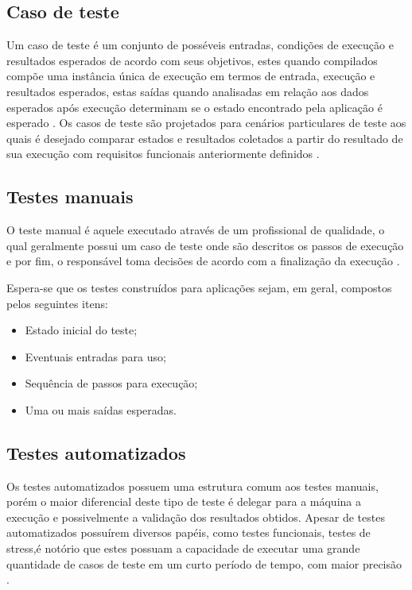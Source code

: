 \documentclass[
	12pt,				%
	oneside,			%
	a4paper,			%
	english,			%
	brazil				%
	]{abntex2ppgsi}
\begin{document}
\subsection{Caso de teste}
Um caso de teste  é um conjunto de posséveis entradas, condições de execução e resultados esperados de acordo com seus objetivos, estes quando compilados compõe uma instância única de execução em termos de entrada, execução e resultados esperados, estas saídas quando analisadas em relação aos dados esperados após execução determinam se o estado encontrado pela aplicação  é esperado \cite{Singh2014}. Os casos de teste são projetados para cenários particulares de teste aos quais é desejado comparar estados e resultados coletados a partir do resultado de sua execução com requisitos funcionais anteriormente definidos \cite{Jacob2016}.


\subsection{Testes manuais}
O teste manual  é aquele executado através de um profissional de qualidade, o qual geralmente possui um caso de teste onde são descritos os passos de execução e por fim, o responsável toma decisões de acordo com a finalização da execução \cite{Kaprocki2015}.

Espera-se que os testes construídos para aplicações sejam, em geral, compostos pelos seguintes itens:

\begin{itemize}
	\item Estado inicial do teste;
	\item Eventuais entradas para uso;
	\item Sequência de passos para execução; 
	\item Uma ou mais saídas esperadas.
\end{itemize}

\subsection{Testes automatizados}

Os testes automatizados possuem uma estrutura comum aos testes manuais, porém o maior diferencial deste tipo de teste é delegar para a máquina a execução e possivelmente a validação dos resultados obtidos. Apesar de testes automatizados possuírem diversos papéis, como testes funcionais, testes de stress,é notório que estes possuam a capacidade de executar uma grande quantidade de casos de teste em um curto período de tempo, com maior precisão \cite{Kaprocki2015}.
\end{document}
